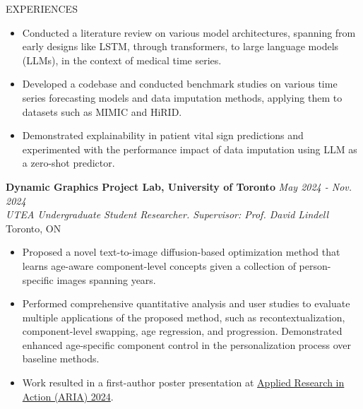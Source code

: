 \documentclass{resume} %
\begin{document}
\begin{rSection}{EXPERIENCES}
\begin{itemize} 
    \vspace{-0.2cm}\item Conducted a literature review on various model architectures, spanning from early designs like LSTM, through transformers, to large language models (LLMs), in the context of medical time series. 
    \vspace{-0.2cm}\item Developed a codebase and conducted benchmark studies on various time series forecasting models and data imputation methods, applying them to datasets such as MIMIC and HiRID. \vspace{-0.2cm}\item Demonstrated explainability in patient vital sign predictions and experimented with the performance impact of data imputation using LLM as a zero-shot predictor. 
\end{itemize}
{\bf Dynamic Graphics Project Lab, University of Toronto} \hfill {\em May 2024 - Nov. 2024} 
\\{\textit{UTEA Undergraduate Student Researcher. Supervisor: Prof. David Lindell} \hfill {Toronto, ON}}
\begin{itemize}
    \vspace{-0.2cm}\item Proposed a novel text-to-image diffusion-based optimization method that learns age-aware component-level concepts given a collection of person-specific images spanning years. 
    \vspace{-0.2cm}\item Performed comprehensive quantitative analysis and user studies to evaluate multiple applications of the proposed method, such as recontextualization, component-level swapping, age regression, and progression. Demonstrated enhanced age-specific component control in the personalization process over baseline methods. 
    \vspace{-0.2cm}\item Work resulted in a first-author poster presentation at \href{https://drive.google.com/file/d/1q59ebZQiwBY9UgBKMJEUWeX32UDor3Ja/view?usp=sharing}{Applied Research in Action (ARIA) 2024}.
\end{itemize}




\end{rSection}
\end{document}
